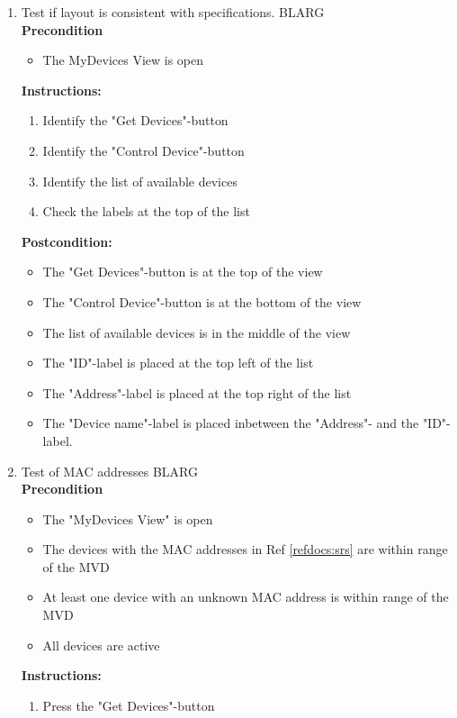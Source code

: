 \documentclass[a4paper]{article}
\newlength{\testlabellength}
\newenvironment{testlist}{\begin{enumerate}[label=\bfseries Instruction \thesubsection.\arabic* , labelindent=0pt, labelwidth=\testlabellength , leftmargin=2cm]}{\end{enumerate}}
\newenvironment{precondition}{
{\color{white}BLARG}\\ 
\textbf{Precondition}
\begin{itemize}[labelindent=0cm, labelwidth=2cm , leftmargin=1cm]
}
{\end{itemize}}
\newenvironment{instruction}{
\textbf{Instructions:}
\begin{enumerate}[label=\bfseries  \arabic*., labelindent=0cm, labelwidth=2cm , leftmargin=1cm]
}
{\end{enumerate}}
\newenvironment{postcondition}{
\textbf{Postcondition:}
\begin{itemize}[labelindent=0cm, labelwidth=2cm , leftmargin=1cm]
}
{\end{itemize}}
\begin{document}
\begin{appendices}
\begin{testlist}
    \item Test if layout is consistent with specifications.
		\begin{precondition}
			\item The MyDevices View is open
		\end{precondition}
		
		\begin{instruction}
			\item Identify the "Get Devices"-button
			\item Identify the "Control Device"-button
			\item Identify the list of available devices
			\item Check the labels at the top of the list	
		\end{instruction}		
		
		\begin{postcondition}
 			\item The "Get Devices"-button is at the top of the view
 			\item The "Control Device"-button is at the bottom of the view
 			\item The list of available devices is in the middle of the view
 			\item The "ID"-label is placed at the top left of the list
 			\item The "Address"-label is placed at the top right of the list 
 			\item The "Device name"-label is placed inbetween the "Address"- and the "ID"-label. 
		\end{postcondition}
		   
    
	\item Test of MAC addresses
		\begin{precondition}
			\item The "MyDevices View" is open
			\item The devices with the MAC addresses in Ref \ref{refdocs:srs} are within range of the MVD
			\item At least one device with an unknown MAC address is within range of the MVD
			\item All devices are active
		\end{precondition}
		
		\begin{instruction}
			\item Press the "Get Devices"-button
		\end{instruction}
		

\end{testlist}
\end{appendices}
\end{document}
